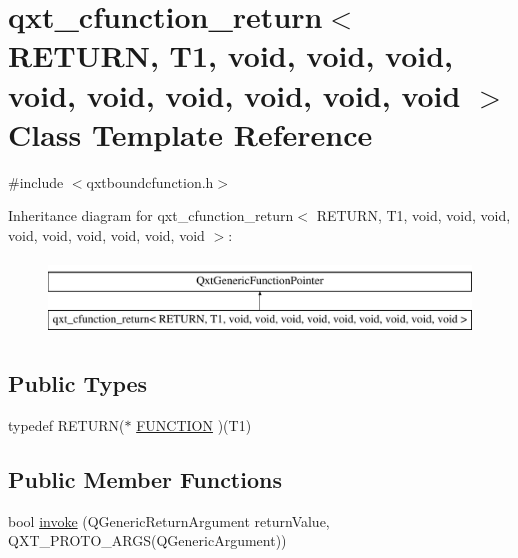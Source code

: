 \hypertarget{classqxt__cfunction__return_3_01_r_e_t_u_r_n_00_01_t1_00_01void_00_01void_00_01void_00_01void_004b10d2090ecf78481943e8d18babd4cd}{\section{qxt\-\_\-cfunction\-\_\-return$<$ R\-E\-T\-U\-R\-N, T1, void, void, void, void, void, void, void, void, void $>$ Class Template Reference}
\label{classqxt__cfunction__return_3_01_r_e_t_u_r_n_00_01_t1_00_01void_00_01void_00_01void_00_01void_004b10d2090ecf78481943e8d18babd4cd}
}


{\ttfamily \#include $<$qxtboundcfunction.\-h$>$}

Inheritance diagram for qxt\-\_\-cfunction\-\_\-return$<$ R\-E\-T\-U\-R\-N, T1, void, void, void, void, void, void, void, void, void $>$\-:\begin{figure}[H]
\begin{center}
\leavevmode
\includegraphics[height=2.000000cm]{classqxt__cfunction__return_3_01_r_e_t_u_r_n_00_01_t1_00_01void_00_01void_00_01void_00_01void_004b10d2090ecf78481943e8d18babd4cd}
\end{center}
\end{figure}
\subsection*{Public Types}
\begin{DoxyCompactItemize}
\item 
typedef R\-E\-T\-U\-R\-N($\ast$ \hyperlink{classqxt__cfunction__return_3_01_r_e_t_u_r_n_00_01_t1_00_01void_00_01void_00_01void_00_01void_004b10d2090ecf78481943e8d18babd4cd_a6b0605f75147dccc39454cadf00569ce}{F\-U\-N\-C\-T\-I\-O\-N} )(T1)
\end{DoxyCompactItemize}
\subsection*{Public Member Functions}
\begin{DoxyCompactItemize}
\item 
bool \hyperlink{classqxt__cfunction__return_3_01_r_e_t_u_r_n_00_01_t1_00_01void_00_01void_00_01void_00_01void_004b10d2090ecf78481943e8d18babd4cd_a885e5b9a2306613d371a1ee038e60ef3}{invoke} (Q\-Generic\-Return\-Argument return\-Value, Q\-X\-T\-\_\-\-P\-R\-O\-T\-O\-\_\-A\-R\-G\-S(Q\-Generic\-Argument))
\end{DoxyCompactItemize}
